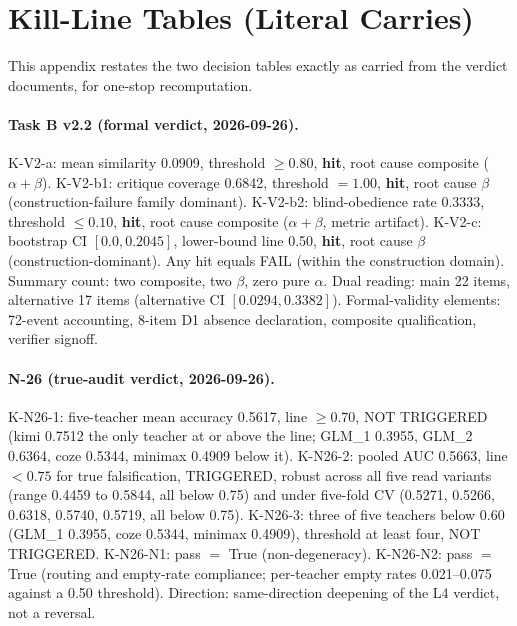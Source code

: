 \documentclass[11pt]{article}
\newcommand{\hit}{\textbf{hit}}
\begin{document}
\section{Kill-Line Tables (Literal Carries)}\label{app:kill}

This appendix restates the two decision tables exactly as carried from the verdict documents, for one-stop recomputation.

\paragraph{Task B v2.2 (formal verdict, 2026-09-26).}
K-V2-a: mean similarity 0.0909, threshold $\geq 0.80$, \hit, root cause composite ($\alpha + \beta$). K-V2-b1: critique coverage 0.6842, threshold $= 1.00$, \hit, root cause $\beta$ (construction-failure family dominant). K-V2-b2: blind-obedience rate 0.3333, threshold $\leq 0.10$, \hit, root cause composite ($\alpha + \beta$, metric artifact). K-V2-c: bootstrap CI $[0.0, 0.2045]$, lower-bound line 0.50, \hit, root cause $\beta$ (construction-dominant). Any hit equals FAIL (within the construction domain). Summary count: two composite, two $\beta$, zero pure $\alpha$. Dual reading: main 22 items, alternative 17 items (alternative CI $[0.0294, 0.3382]$). Formal-validity elements: 72-event accounting, 8-item D1 absence declaration, composite qualification, verifier signoff.

\paragraph{N-26 (true-audit verdict, 2026-09-26).}
K-N26-1: five-teacher mean accuracy 0.5617, line $\geq 0.70$, NOT TRIGGERED (kimi 0.7512 the only teacher at or above the line; GLM\_1 0.3955, GLM\_2 0.6364, coze 0.5344, minimax 0.4909 below it). K-N26-2: pooled AUC 0.5663, line $< 0.75$ for true falsification, TRIGGERED, robust across all five read variants (range 0.4459 to 0.5844, all below 0.75) and under five-fold CV (0.5271, 0.5266, 0.6318, 0.5740, 0.5719, all below 0.75). K-N26-3: three of five teachers below 0.60 (GLM\_1 0.3955, coze 0.5344, minimax 0.4909), threshold at least four, NOT TRIGGERED. K-N26-N1: pass $=$ True (non-degeneracy). K-N26-N2: pass $=$ True (routing and empty-rate compliance; per-teacher empty rates 0.021--0.075 against a 0.50 threshold). Direction: same-direction deepening of the L4 verdict, not a reversal.
\end{document}
